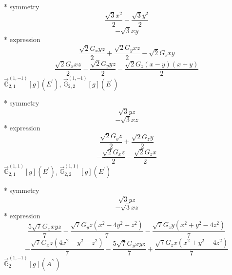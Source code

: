 \documentclass[fleqn,8pt]{jsarticle}
\begin{document}
\noindent\quad ** symmetry
\begin{dmath*}
\frac{\sqrt{3} x^{2}}{2} - \frac{\sqrt{3} y^{2}}{2}
\end{dmath*}
\begin{dmath*}
- \sqrt{3} x y
\end{dmath*}
\noindent\quad ** expression
\begin{dmath*}
\frac{\sqrt{2} G_{x} y z}{2} + \frac{\sqrt{2} G_{y} x z}{2} - \sqrt{2} G_{z} x y
\end{dmath*}
\begin{dmath*}
\frac{\sqrt{2} G_{x} x z}{2} - \frac{\sqrt{2} G_{y} y z}{2} - \frac{\sqrt{2} G_{z} \left(x - y\right) \left(x + y\right)}{2}
\end{dmath*}
\noindent\quad $\vec{\mathbb{G}}_{2,1}^{(1,-1)}[g](E^{\prime})$, $\vec{\mathbb{G}}_{2,2}^{(1,-1)}[g](E^{\prime})$

\noindent\quad ** symmetry
\begin{dmath*}
\sqrt{3} y z
\end{dmath*}
\begin{dmath*}
- \sqrt{3} x z
\end{dmath*}
\noindent\quad ** expression
\begin{dmath*}
\frac{\sqrt{2} G_{y} z}{2} + \frac{\sqrt{2} G_{z} y}{2}
\end{dmath*}
\begin{dmath*}
- \frac{\sqrt{2} G_{x} z}{2} - \frac{\sqrt{2} G_{z} x}{2}
\end{dmath*}
\noindent\quad $\vec{\mathbb{G}}_{2,1}^{(1,1)}[g](E^{\prime})$, $\vec{\mathbb{G}}_{2,2}^{(1,1)}[g](E^{\prime})$

\noindent\quad ** symmetry
\begin{dmath*}
\sqrt{3} y z
\end{dmath*}
\begin{dmath*}
- \sqrt{3} x z
\end{dmath*}
\noindent\quad ** expression
\begin{dmath*}
\frac{5 \sqrt{7} G_{x} x y z}{7} - \frac{\sqrt{7} G_{y} z \left(x^{2} - 4 y^{2} + z^{2}\right)}{7} - \frac{\sqrt{7} G_{z} y \left(x^{2} + y^{2} - 4 z^{2}\right)}{7}
\end{dmath*}
\begin{dmath*}
- \frac{\sqrt{7} G_{x} z \left(4 x^{2} - y^{2} - z^{2}\right)}{7} - \frac{5 \sqrt{7} G_{y} x y z}{7} + \frac{\sqrt{7} G_{z} x \left(x^{2} + y^{2} - 4 z^{2}\right)}{7}
\end{dmath*}
\noindent\quad $\vec{\mathbb{G}}_{2}^{(1,-1)}[g](A^{\prime\prime})$
\end{document}
